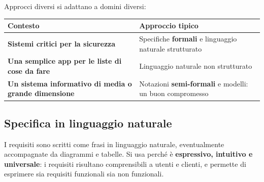 Approcci diversi si adattano a domini diversi:

\begin{table}[H]
\centering
\renewcommand{\arraystretch}{1.4}
\begin{tabularx}{\textwidth}{>{\bfseries}P{5.2cm} L}
\toprule
Contesto & Approccio tipico \\
\midrule
Sistemi critici per la sicurezza & Specifiche \textbf{formali} e linguaggio naturale strutturato \\
Una semplice app per le liste di cose da fare & Linguaggio naturale non strutturato \\
Un sistema informativo di media o grande dimensione & Notazioni \textbf{semi-formali} e modelli: un buon compromesso \\
\bottomrule
\end{tabularx}
\end{table}

\subsection{Specifica in linguaggio naturale}

I requisiti sono scritti come frasi in linguaggio naturale, eventualmente accompagnate da diagrammi e tabelle.
Si usa perché è \textbf{espressivo, intuitivo e universale}: i requisiti risultano comprensibili a utenti e clienti,
e permette di esprimere sia requisiti funzionali sia non funzionali.

